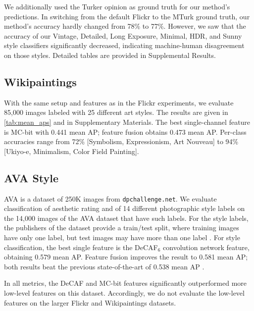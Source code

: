 We additionally used the Turker opinion as ground truth for our method's predictions.
In switching from the default Flickr to the MTurk ground truth, our method's accuracy hardly changed from 78\% to 77\%.
However, we saw that the accuracy of our Vintage, Detailed, Long Exposure, Minimal, HDR, and Sunny style classifiers significantly decreased, indicating machine-human disagreement on those styles.
Detailed tables are provided in Supplemental Results.

\subsection{Wikipaintings}
With the same setup and features as in the Flickr experiments, we evaluate 85,000 images labeled with 25 different art styles.
The results are given in \autoref{tab:mean_aps} and in Supplementary Materials.
The best single-channel feature is MC-bit with 0.441 mean AP; feature fusion obtains 0.473 mean AP.
Per-class accuracies range from 72\% [Symbolism, Expressionism, Art Nouveau] to 94\% [Ukiyo-e, Minimalism, Color Field Painting].

\subsection{AVA Style}
AVA \cite{Murray-CVPR-2012} is a dataset of 250K images from \texttt{dpchallenge.net}.
We evaluate classification of aesthetic rating and of 14 different photographic style labels on the 14,000 images of the AVA dataset that have such labels.
For the style labels, the publishers of the dataset provide a train/test split, where training images have only one label, but test images may have more than one label \cite{Murray-CVPR-2012}.
For style classification, the best single feature is the DeCAF$_6$ convolution network feature, obtaining 0.579 mean AP.
Feature fusion improves the result to 0.581 mean AP; both results beat the previous state-of-the-art of 0.538 mean AP \cite{Murray-CVPR-2012}.

In all metrics, the DeCAF and MC-bit features significantly outperformed more low-level features on this dataset.
Accordingly, we do not evaluate the low-level features on the larger Flickr and Wikipaintings datasets.
